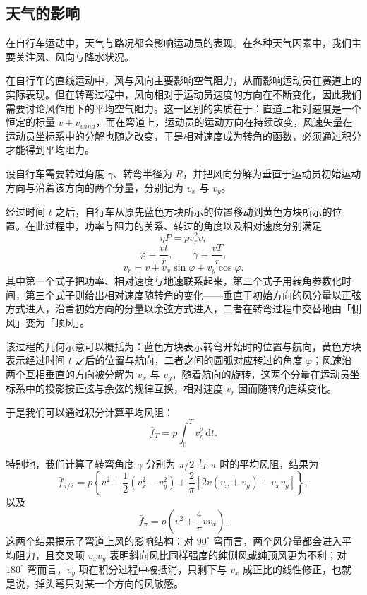 \documentclass[11pt,a4paper]{ctexart}
\begin{document}
\subsection{天气的影响}

在自行车运动中，天气与路况都会影响运动员的表现。在各种天气因素中，我们主要关注风、风向与降水状况。

在自行车的直线运动中，风与风向主要影响空气阻力，从而影响运动员在赛道上的实际表现。但在转弯过程中，风向相对于运动员速度的方向在不断变化，因此我们需要讨论风作用下的平均空气阻力。这一区别的实质在于：直道上相对速度是一个恒定的标量 $v\pm v_{wind}$，而在弯道上，运动员的运动方向在持续改变，风速矢量在运动员坐标系中的分解也随之改变，于是相对速度成为转角的函数，必须通过积分才能得到平均阻力。

设自行车需要转过角度 $\gamma$、转弯半径为 $R$，并把风向分解为垂直于运动员初始运动方向与沿着该方向的两个分量，分别记为 $v_x$ 与 $v_y$。

经过时间 $t$ 之后，自行车从原先蓝色方块所示的位置移动到黄色方块所示的位置。在此过程中，功率与阻力的关系、转过的角度以及相对速度分别满足
\begin{equation}
\eta P=p v_r^{2}v,
\end{equation}
\begin{equation}
\varphi=\frac{vt}{r},\qquad \gamma=\frac{vT}{r},
\end{equation}
\begin{equation}
v_r=v+v_x\sin\varphi+v_y\cos\varphi.
\end{equation}
其中第一个式子把功率、相对速度与地速联系起来，第二个式子用转角参数化时间，第三个式子则给出相对速度随转角的变化——垂直于初始方向的风分量以正弦方式进入，沿着初始方向的分量以余弦方式进入，二者在转弯过程中交替地由「侧风」变为「顶风」。

该过程的几何示意可以概括为：蓝色方块表示转弯开始时的位置与航向，黄色方块表示经过时间 $t$ 之后的位置与航向，二者之间的圆弧对应转过的角度 $\varphi$；风速沿两个互相垂直的方向被分解为 $v_x$ 与 $v_y$，随着航向的旋转，这两个分量在运动员坐标系中的投影按正弦与余弦的规律互换，相对速度 $v_r$ 因而随转角连续变化。

于是我们可以通过积分计算平均风阻：
\begin{equation}
\bar{f}_T=p\int_{0}^{T}v_r^{2}\,\mathrm{d}t.
\end{equation}

特别地，我们计算了转弯角度 $\gamma$ 分别为 $\pi/2$ 与 $\pi$ 时的平均风阻，结果为
\begin{equation}
\bar{f}_{\pi/2}=p\left\{v^{2}+\frac{1}{2}\left(v_x^{2}-v_y^{2}\right)+\frac{2}{\pi}\left[2v\left(v_x+v_y\right)+v_xv_y\right]\right\},
\end{equation}
以及
\begin{equation}
\bar{f}_{\pi}=p\left(v^{2}+\frac{4}{\pi}vv_x\right).
\end{equation}
这两个结果揭示了弯道上风的影响结构：对 $90^\circ$ 弯而言，两个风分量都会进入平均阻力，且交叉项 $v_xv_y$ 表明斜向风比同样强度的纯侧风或纯顶风更为不利；对 $180^\circ$ 弯而言，$v_y$ 项在积分过程中被抵消，只剩下与 $v_x$ 成正比的线性修正，也就是说，掉头弯只对某一个方向的风敏感。
\end{document}
